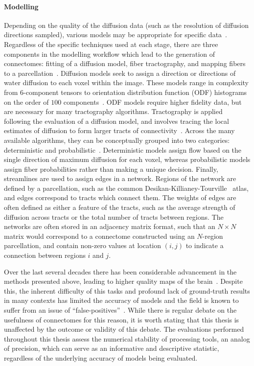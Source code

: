 \paragraph*{Modelling}
Depending on the quality of the diffusion data (such as the resolution of diffusion directions sampled), various models
may be appropriate for specific data~\cite{jeurissen2019diffusion,tournier2011diffusion,mori2013introduction}.
Regardless of the specific techniques used at each stage, there are three components in the modelling workflow which
lead to the generation of connectomes: fitting of a diffusion model, fiber tractography, and mapping fibers to a
parcellation~\cite{roncal2013migraine,sporns2005human,Kiar2018-jt,Glasser2013-vf}. Diffusion models seek to assign a
direction or directions of water diffusion to each voxel within the image. These models range in complexity from
$6$-component tensors to orientation distribution function (ODF) histograms on the order of $100$
components~\cite{tournier2011diffusion}. ODF models require higher fidelity data, but are necessary for many
tractography algorithms. Tractography is applied following the evaluation of a diffusion model, and involves tracing
the local estimates of diffusion to form larger tracts of connectivity~\cite{behrens2014mr}. Across the many available
algorithms, they can be conceptually grouped into two categories: deterministic and
probabilistic~\cite{jeurissen2019diffusion}. Deterministic models assign flow based on the single direction of maximum
diffusion for each voxel, whereas probabilistic models assign fiber probabilities rather than making a unique decision.
Finally, streamlines are used to assign edges in a network. Regions of the network are defined by a parcellation, such
as the common Desikan-Killianey-Tourville~\cite{Klein2012-vi} atlas, and edges correspond to tracts which connect them.
The weights of edges are often defined as either a feature of the tracts, such as the average strength of diffusion
across tracts or the total number of tracts between regions. The networks are often stored in an adjacency matrix
format, such that an $N \times N$ matrix would correspond to a connectome constructed using an $N$-region parcellation,
and contain non-zero values at location $(i,j)$ to indicate a connection between regions $i$ and $j$.

Over the last several decades there has been considerable advancement in the methods presented above, leading to higher
quality maps of the brain~\cite{GIRARD2020117201}. Despite this, the inherent difficulty of this tasks and profound
lack of ground-truth results in many contexts has limited the accuracy of models and the field is known to suffer from
an issue of ``false-positives''~\cite{Thomas16574,sotiropoulos2019building,maier2017challenge}. While there is regular
debate on the usefulness of connectomes for this reason, it is worth stating that this thesis is unaffected by the
outcome or validity of this debate. The evaluations performed throughout this thesis assess the numerical stability of
processing tools, an analog of precision, which can serve as an informative and descriptive statistic, regardless of
the underlying accuracy of models being evaluated.

